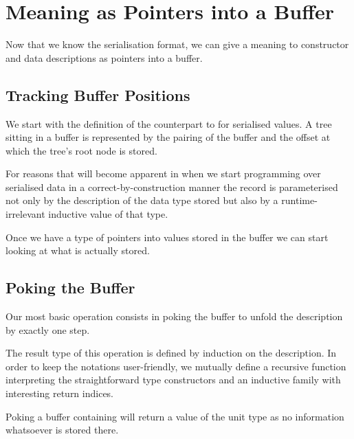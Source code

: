 \section{Meaning as Pointers into a Buffer}\label{sec:pointers}

Now that we know the serialisation format, we can give a meaning
to constructor and data descriptions as pointers into a buffer.

\subsection{Tracking Buffer Positions}

We start with the definition of the counterpart to 
for serialised values. A tree sitting in a buffer is represented
by the pairing of the buffer and the offset at which the tree's
root node is stored.


For reasons that will become apparent in 
when we start programming over serialised data in a correct-by-construction
manner the record  is parameterised not only by the description
of the data type stored but also by a runtime-irrelevant inductive value of
that type.




Once we have a type of pointers into values stored in the buffer
we can start looking at what is actually stored.

\subsection{Poking the Buffer}

Our most basic operation consists in poking the buffer to unfold
the description by exactly one step.


The result type of this operation is defined by induction on the
description. In order to keep the notations user-friendly, we
mutually define
a recursive function  interpreting the straightforward type constructors
and an inductive family  with interesting return indices.


Poking a buffer containing  will return a value of
the unit type as no information whatsoever is stored there.

